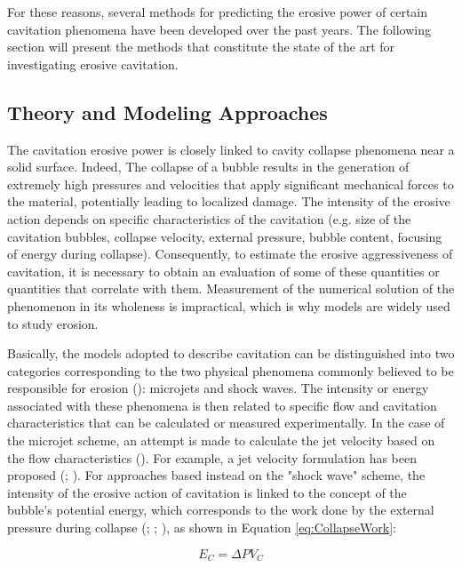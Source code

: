 For these reasons, several methods for predicting the erosive power of certain cavitation phenomena have been developed over the past years. The following section will present the methods that constitute the state of the art for investigating erosive cavitation.

\subsection{Theory and Modeling Approaches}

The cavitation erosive power is closely linked to cavity collapse phenomena near a solid surface. Indeed, The collapse of a bubble results in the generation of extremely high pressures and velocities that apply significant mechanical forces to the material, potentially leading to localized damage.
The intensity of the erosive action depends on specific characteristics of the cavitation (e.g. size of the cavitation bubbles, collapse velocity, external pressure, bubble content, focusing of energy during collapse). 
Consequently, to estimate the erosive aggressiveness of cavitation, it is necessary to obtain an evaluation of some of these quantities or quantities that correlate with them. Measurement of the numerical solution of the phenomenon in its wholeness is impractical, which is why models are widely used to study erosion.

Basically, the models adopted to describe cavitation can be distinguished into two categories corresponding to the two physical phenomena commonly believed to be responsible for erosion (\cite{lecoffre1999}): microjets and shock waves. 
The intensity or energy associated with these phenomena is then related to specific flow and cavitation characteristics that can be calculated or measured experimentally. 
In the case of the microjet scheme, an attempt is made to calculate the jet velocity based on the flow characteristics (\cite{Peters2018}). For example, a jet velocity formulation has been proposed (\cite{Dular2009}; \cite{Peters2015}).
For approaches based instead on the "shock wave" scheme, the intensity of the erosive action of cavitation is linked to the concept of the bubble's potential energy, which corresponds to the work done by the external pressure during collapse (\cite{Hammitt1963}; \cite{Pereira1998}; \cite{Vogel1988}), as shown in Equation \ref{eq:CollapseWork}:

\begin{equation}
    E_C = \Delta P V_C
    \label{eq:CollapseWork}
\end{equation}

